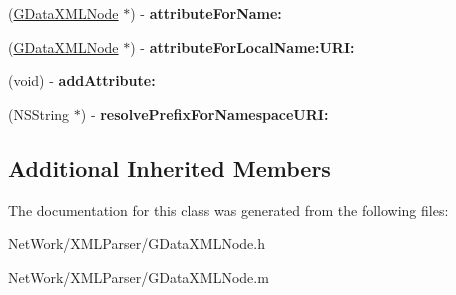 \begin{DoxyCompactItemize}
\item 
\hypertarget{interface_g_data_x_m_l_element_a0823c7ce613abf40d5913805cbf54a8e}{(\hyperlink{interface_g_data_x_m_l_node}{G\+Data\+X\+M\+L\+Node} $\ast$) -\/ {\bfseries attribute\+For\+Name\+:}}\label{interface_g_data_x_m_l_element_a0823c7ce613abf40d5913805cbf54a8e}

\item 
\hypertarget{interface_g_data_x_m_l_element_aa685fc8bb2453aa2af8543eaa3ac27bc}{(\hyperlink{interface_g_data_x_m_l_node}{G\+Data\+X\+M\+L\+Node} $\ast$) -\/ {\bfseries attribute\+For\+Local\+Name\+:\+U\+R\+I\+:}}\label{interface_g_data_x_m_l_element_aa685fc8bb2453aa2af8543eaa3ac27bc}

\item 
\hypertarget{interface_g_data_x_m_l_element_a51a2307fd7086c0e814fd7b3d5da86bf}{(void) -\/ {\bfseries add\+Attribute\+:}}\label{interface_g_data_x_m_l_element_a51a2307fd7086c0e814fd7b3d5da86bf}

\item 
\hypertarget{interface_g_data_x_m_l_element_ab27be508b932cbe3d0686659069e41b7}{(N\+S\+String $\ast$) -\/ {\bfseries resolve\+Prefix\+For\+Namespace\+U\+R\+I\+:}}\label{interface_g_data_x_m_l_element_ab27be508b932cbe3d0686659069e41b7}

\end{DoxyCompactItemize}
\subsection*{Additional Inherited Members}


The documentation for this class was generated from the following files\+:\begin{DoxyCompactItemize}
\item 
Net\+Work/\+X\+M\+L\+Parser/G\+Data\+X\+M\+L\+Node.\+h\item 
Net\+Work/\+X\+M\+L\+Parser/G\+Data\+X\+M\+L\+Node.\+m\end{DoxyCompactItemize}
